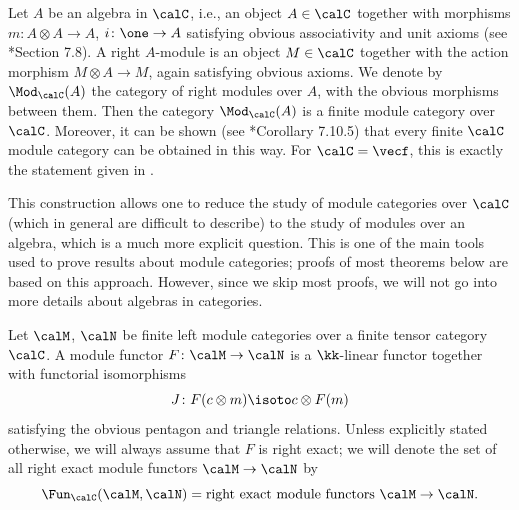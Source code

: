 \begin{example}\label{x:algebra-in-cat}
  Let $A$ be an algebra in $\calC$, i.e., an object $A\in \calC$ together with
  morphisms $m\colon A\otimes A\to A$, $i\colon \one\to A$ satisfying obvious
  associativity and unit axioms (see *{Section 7.8}). A
  right $A$-module is an object $M\in \calC$ together with the action morphism
  $M\otimes A\to M$, again satisfying obvious axioms. We denote by
  $\Mod_\calC(A)$ the category of right modules over $A$, with the obvious
  morphisms between them. Then the category $\Mod_\calC(A)$ is a finite module
  category over $\calC$. Moreover, it can be shown (see
  *{Corollary 7.10.5}) that every finite $\calC$ module
  category can be obtained in this way. For $\calC=\vecf$, this is exactly the
  statement given in .

  This construction allows one to reduce the study of module categories over
  $\calC$ (which in general are difficult to describe) to the study of modules
  over an algebra, which is a much more explicit question. This is one of the
  main tools used to prove results about module categories; proofs of most
  theorems below are based on this approach. However, since we skip most
  proofs, we will not go into more details about algebras in categories.
\end{example}


\begin{definition}\label{d:module-functor}
  Let $\calM$, $\calN$ be finite left module categories over a finite tensor
  category $\calC$. A module functor $F\colon \calM\to \calN$ is a $\kk$-linear
  functor together with functorial isomorphisms
  $$
    J\colon F(c\otimes m)\isoto c\otimes F(m)
  $$
  satisfying the obvious pentagon and triangle relations. Unless explicitly
  stated otherwise, we will always assume that $F$ is right exact; we will
  denote the set of all right exact module functors $\calM\to \calN$ by
  $$
    \Fun_\calC(\calM, \calN)=\text{right exact module functors }\calM\to\calN.
  $$
\end{definition}


